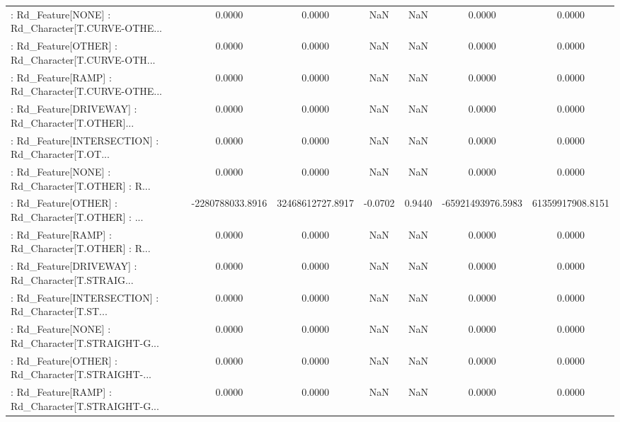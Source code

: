 \begin{longtable}{p{4cm}cccccc}
 : Rd\_Feature[NONE] : Rd\_Character[T.CURVE-OTHE... &            0.0000 &            0.0000 &     NaN &          NaN &             0.0000 &            0.0000 \\
 : Rd\_Feature[OTHER] : Rd\_Character[T.CURVE-OTH... &            0.0000 &            0.0000 &     NaN &          NaN &             0.0000 &            0.0000 \\
 : Rd\_Feature[RAMP] : Rd\_Character[T.CURVE-OTHE... &            0.0000 &            0.0000 &     NaN &          NaN &             0.0000 &            0.0000 \\
 : Rd\_Feature[DRIVEWAY] : Rd\_Character[T.OTHER]... &            0.0000 &            0.0000 &     NaN &          NaN &             0.0000 &            0.0000 \\
 : Rd\_Feature[INTERSECTION] : Rd\_Character[T.OT... &            0.0000 &            0.0000 &     NaN &          NaN &             0.0000 &            0.0000 \\
 : Rd\_Feature[NONE] : Rd\_Character[T.OTHER] : R... &            0.0000 &            0.0000 &     NaN &          NaN &             0.0000 &            0.0000 \\
 : Rd\_Feature[OTHER] : Rd\_Character[T.OTHER] : ... &  -2280788033.8916 &  32468612727.8917 & -0.0702 &       0.9440 &  -65921493976.5983 &  61359917908.8151 \\
 : Rd\_Feature[RAMP] : Rd\_Character[T.OTHER] : R... &            0.0000 &            0.0000 &     NaN &          NaN &             0.0000 &            0.0000 \\
 : Rd\_Feature[DRIVEWAY] : Rd\_Character[T.STRAIG... &            0.0000 &            0.0000 &     NaN &          NaN &             0.0000 &            0.0000 \\
 : Rd\_Feature[INTERSECTION] : Rd\_Character[T.ST... &            0.0000 &            0.0000 &     NaN &          NaN &             0.0000 &            0.0000 \\
 : Rd\_Feature[NONE] : Rd\_Character[T.STRAIGHT-G... &            0.0000 &            0.0000 &     NaN &          NaN &             0.0000 &            0.0000 \\
 : Rd\_Feature[OTHER] : Rd\_Character[T.STRAIGHT-... &            0.0000 &            0.0000 &     NaN &          NaN &             0.0000 &            0.0000 \\
 : Rd\_Feature[RAMP] : Rd\_Character[T.STRAIGHT-G... &            0.0000 &            0.0000 &     NaN &          NaN &             0.0000 &            0.0000 \\

\end{longtable}
